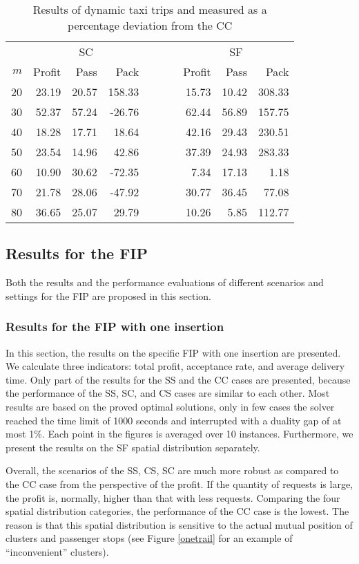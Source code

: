 \documentclass[preprint,authoryear,12pt]{elsarticle}
\begin{document}
\begin{table} [!htbp]
\caption{Results of dynamic taxi trips and measured as a percentage deviation from the CC}
\vspace{-1em}
\center
\small
\begin{tabular}{r r r r r r r r}
\hline
&\multicolumn{3}{c}{SC}& ~~~~ &\multicolumn{3}{c}{SF}\\
$m$& Profit & Pass & Pack & &Profit & Pass & Pack\\
\hline
20&23.19& 20.57 & 158.33 & & 15.73  & 10.42 & 308.33 \\
30&52.37 & 57.24 & -26.76 &  & 62.44 & 56.89 & 157.75 \\ 
40&18.28  & 17.71 & 18.64 & & 42.16 & 29.43 & 230.51 \\ 
50&23.54 & 14.96 & 42.86 & & 37.39 & 24.93 & 283.33 \\ 
60&10.90 & 30.62 & -72.35 & & 7.34  & 17.13 & 1.18 \\ 
70&21.78 & 28.06& -47.92 & & 30.77 & 36.45  & 77.08 \\ 
80&36.65 & 25.07 & 29.79 & & 10.26 & 5.85  & 112.77 \\ 
\hline
\end{tabular}
\label{online}
\end{table}

\subsection{Results for the FIP}
\label{fip_results}
Both the results and the performance evaluations of different scenarios and settings for the FIP are proposed in this section.
\subsubsection{Results for the FIP with one insertion}
\label{1fip_results}
In this section, the results on the specific FIP with one insertion are presented. We calculate three indicators: total profit, acceptance rate, and average delivery time. Only part of the results for the SS and the CC cases are presented, because the performance of the SS, SC, and CS cases are similar to each other. Most results are based on the proved optimal solutions, only in few cases the solver reached the time limit of 1000 seconds and interrupted with a duality gap of at most 1\%. Each point in the figures is averaged over 10 instances. Furthermore, we present the results on the SF spatial distribution separately.

Overall, the scenarios of the SS, CS, SC are much more robust as compared to the CC case from the perspective of the profit. If the quantity of requests is large, the profit is, normally, higher than that with less requests. Comparing the four spatial distribution categories, the performance of the CC case is the lowest. The reason is that this spatial distribution is sensitive to the actual mutual position of clusters and passenger stops (see Figure \ref{onetrail} for an example of ``inconvenient'' clusters). 
\end{document}
